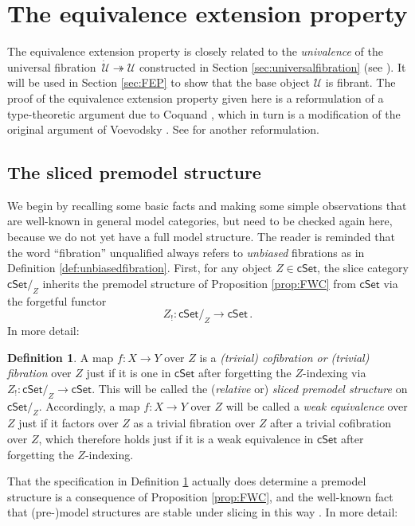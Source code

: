 \documentclass[11pt,reqno]{amsart}
\newcommand{\cSet}{\ensuremath{\mathsf{cSet}}}
\newcommand{\cSetZ}{\ensuremath{\mathsf{cSet}/_{\!Z}}}
\newcommand{\fib}{\ensuremath{\twoheadrightarrow}}
\renewcommand{\to}{\ensuremath{\rightarrow}}
\newcommand{\too}{\ensuremath{\longrightarrow}}
\newcommand{\U}{\ensuremath{\mathcal{U}}}
\newcommand{\UU}{\ensuremath{\,\dot{\mathcal{U}}}}
\theoremstyle{remark}
\theoremstyle{definition}
\newtheorem{definition}[theorem]{Definition}
\begin{document}
\section{The equivalence extension property}\label{sec:EEP}

The equivalence extension property is closely related to the \emph{univalence} of the universal fibration $\UU\fib\U$ constructed in Section \ref{sec:universalfibration} (see \cite{Shu:15}).  It will be used in Section \ref{sec:FEP} to show that the base object $\U$ is fibrant.  The proof of the equivalence extension property given here is a reformulation of a type-theoretic argument due to Coquand \cite{CCHM:2018ctt}, which in turn is a modification of the original argument of Voevodsky \cite{KLV:21}.  See \cite{Sattler:2017ee} for another reformulation.  

\subsection*{The sliced premodel structure}

We begin by recalling some basic facts and making some simple observations that are well-known in general model categories, but need to be checked again here, because we do not yet have a full model structure. The reader is reminded that the word ``fibration'' unqualified always refers to \emph{unbiased} fibrations as in Definition \ref{def:unbiasedfibration}.  First, for any object $Z \in\cSet$, the slice category $\cSetZ$  inherits the premodel structure of Proposition \ref{prop:FWC} from $\cSet$ via the forgetful functor 
\[
Z_! : \cSetZ  \too \cSet\,.
\]
In more detail:
\begin{definition}\label{def:slicepremodelstructure}
 A map $f : X \to Y$ over $Z$ is a \emph{(trivial) cofibration or (trivial) fibration} over $Z$ just if it is one in $\cSet$ after forgetting the $Z$-indexing via  $Z_!:\cSetZ \to \cSet$. This will be called the (\emph{relative} or) \emph{sliced premodel structure} on $\cSetZ$.  Accordingly, a map $f : X \to Y$ over $Z$ will be called a \emph{weak equivalence} over $Z$ just if it factors over $Z$ as a trivial fibration over $Z$ after a trivial cofibration over $Z$, which therefore holds just if it is a weak equivalence in $\cSet$ after forgetting the $Z$-indexing.
\end{definition}

That the specification in Definition \ref{def:slicepremodelstructure} actually does determine a premodel structure is a consequence of Proposition \ref{prop:FWC}, and the well-known fact that (pre-)model structures are stable under slicing in this way \cite{Hirschhorn:2003mc}.   In more detail:
\end{document}
